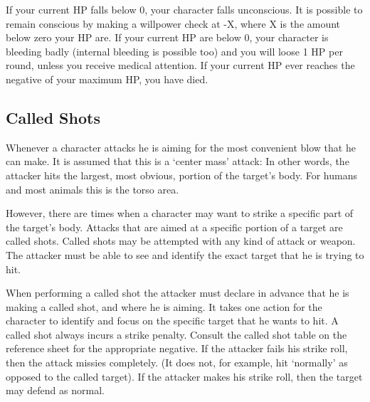 \documentclass[twoside]{book}
\begin{document}
    {  
    If your current HP falls below 0, your character
               falls unconscious. It is possible to remain conscious by
               making a willpower check at -X, where X is the amount
               below zero your HP are. If your current HP are below 0,
               your character is bleeding badly (internal bleeding is
               possible too) and you will loose 1 HP per round, unless
               you receive medical attention. If your current HP ever
               reaches the negative of your maximum HP, you have died.
               
    }
  
    

\subsection{Called Shots}
    
    {  
     Whenever a character attacks he is aiming for the
               most convenient blow that he can make. It is assumed that
               this is a `center mass' attack: In other
               words, the attacker hits the largest, most obvious,
               portion of the target's body. For humans and most
               animals this is the torso area. 
    }
  
    {  
     However, there are times when a character may want
               to strike a specific part of the target's body.
               Attacks that are aimed at a specific portion of a target
               are called shots. Called shots may be attempted with any
               kind of attack or weapon. The attacker must be able to see
               and identify the exact target that he is trying to hit.
               
    }
  
    {  
     When performing a called shot the attacker must
               declare in advance that he is making a called shot, and
               where he is aiming. It takes one action for the character
               to identify and focus on the specific target that he wants
               to hit. A called shot always incurs a strike penalty.
               Consult the called shot table on the reference sheet for
               the appropriate negative. If the attacker fails his strike
               roll, then the attack missies completely. (It does not,
               for example, hit `normally' as opposed to the
               called target). If the attacker makes his strike roll,
               then the target may defend as normal. 
    }
  
\end{document}
